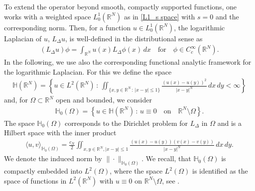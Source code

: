 \documentclass[notitlepage,11pt,reqno]{amsart}
\theoremstyle{definition}
\numberwithin{equation}{section}
\newcommand{\RR}{\mathds{R}}
\begin{document}
To extend the operator beyond smooth, compactly supported functions, one works with a weighted space $L^1_0(\RR^N)$ as in \eqref{L1_s space} with $s=0$ and the corresponding norm. Then, for a function $u \in L^{1}_0(\RR^N)$, the logarithmic Laplacian of $u$, $L_{\Delta}u$, is well-defined in the distributional sense as 
\begin{align*}
    (L_{\Delta}u)\phi =\int_{\RR^N}u (x) L_{\Delta}\phi(x)\, dx \quad \text{for}\quad \phi \in C^{\infty}_c(\RR^N).
\end{align*}
In the following, we use also the corresponding functional analytic framework for the logarithmic Laplacian. For this we define the space
\begin{align*}
  \mathbb{H}(\RR^N)=\left\{u\in L^2(\RR^N)\,:\, \iint_{\{x, y \in \RR^N\,:\,  |x-y|\leq 1\}}\frac{(u(x)-u(y))^2}{|x-y|^N}\, dx\, dy< \infty  \right\} 
\end{align*}
and, for $\Omega \subset \RR^N$ open and bounded, we consider
\begin{align*}
  \mathbb{H}_0(\Omega)=\left\{u \in \mathbb{H}(\RR^N)\,:\, u\equiv 0 \quad\text{on}\quad \RR^N\setminus \Omega\right\}.  
\end{align*}
The space $\mathbb{H}_0(\Omega)$ corresponds to the Dirichlet problem for $L_{\Delta}$ in $\Omega$ and is a Hilbert space with the inner product
\begin{align*}
    \langle u, v \rangle_{\mathbb{H}_0(\Omega)}=\frac{c_N}{2}\iint_{x, y \in \RR^N,  |x-y|\leq 1}\frac{(u(x)-u(y))(v(x)-v(y))}{|x-y|^N}\,dx\, dy.
\end{align*}
We denote the induced norm by $\|\cdot\|_{\mathbb{H}_0(\Omega)}$. We recall, that $\mathbb{H}_0(\Omega)$ is compactly embedded into $L^2(\Omega)$, where the space $L^2(\Omega)$ is identified as the space of functions in $L^{2}(\RR^N)$ with $u\equiv0$ on $\RR^N \setminus \Omega$, see \cite[Theorem 2.1]{CdP18}.\\
\end{document}
